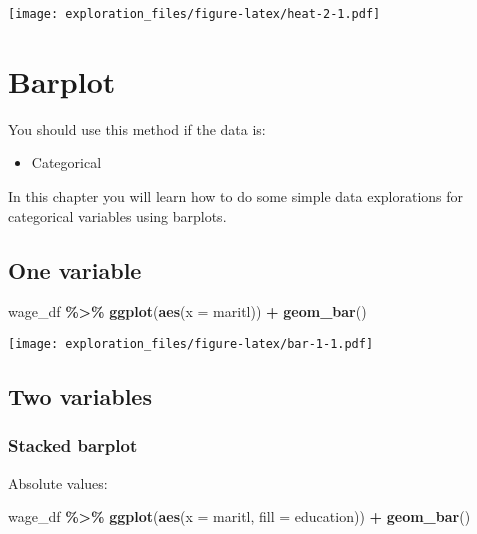 \documentclass[
]{book}
\newenvironment{Shaded}{\begin{snugshade}}{\end{snugshade}}
\newcommand{\DataTypeTok}[1]{\textcolor[rgb]{0.13,0.29,0.53}{#1}}
\newcommand{\KeywordTok}[1]{\textcolor[rgb]{0.13,0.29,0.53}{\textbf{#1}}}
\newcommand{\NormalTok}[1]{#1}
\newcommand{\OperatorTok}[1]{\textcolor[rgb]{0.81,0.36,0.00}{\textbf{#1}}}
\newcommand{\StringTok}[1]{\textcolor[rgb]{0.31,0.60,0.02}{#1}}
\providecommand{\tightlist}{%
  \setlength{\itemsep}{0pt}\setlength{\parskip}{0pt}}
\begin{document}
\texttt{[image: exploration\_files/figure-latex/heat-2-1.pdf]}

\hypertarget{barplot}{%
\chapter{Barplot}\label{barplot}}

You should use this method if the data is:

\begin{itemize}
\tightlist
\item
  Categorical
\end{itemize}

In this chapter you will learn how to do some simple data explorations for categorical variables using barplots.

\hypertarget{one-variable}{%
\section{One variable}\label{one-variable}}

\begin{Shaded}
\begin{Highlighting}[]
\NormalTok{wage\_df }\OperatorTok{\%\textgreater{}\%}\StringTok{ }
\StringTok{  }\KeywordTok{ggplot}\NormalTok{(}\KeywordTok{aes}\NormalTok{(}\DataTypeTok{x =}\NormalTok{ maritl)) }\OperatorTok{+}
\StringTok{  }\KeywordTok{geom\_bar}\NormalTok{()}
\end{Highlighting}
\end{Shaded}

\texttt{[image: exploration\_files/figure-latex/bar-1-1.pdf]}

\hypertarget{two-variables}{%
\section{Two variables}\label{two-variables}}

\hypertarget{stacked-barplot}{%
\subsection{Stacked barplot}\label{stacked-barplot}}

Absolute values:

\begin{Shaded}
\begin{Highlighting}[]
\NormalTok{wage\_df }\OperatorTok{\%\textgreater{}\%}\StringTok{ }
\StringTok{  }\KeywordTok{ggplot}\NormalTok{(}\KeywordTok{aes}\NormalTok{(}\DataTypeTok{x =}\NormalTok{ maritl, }\DataTypeTok{fill =}\NormalTok{ education)) }\OperatorTok{+}\StringTok{ }
\StringTok{  }\KeywordTok{geom\_bar}\NormalTok{()}
\end{Highlighting}
\end{Shaded}
\end{document}
